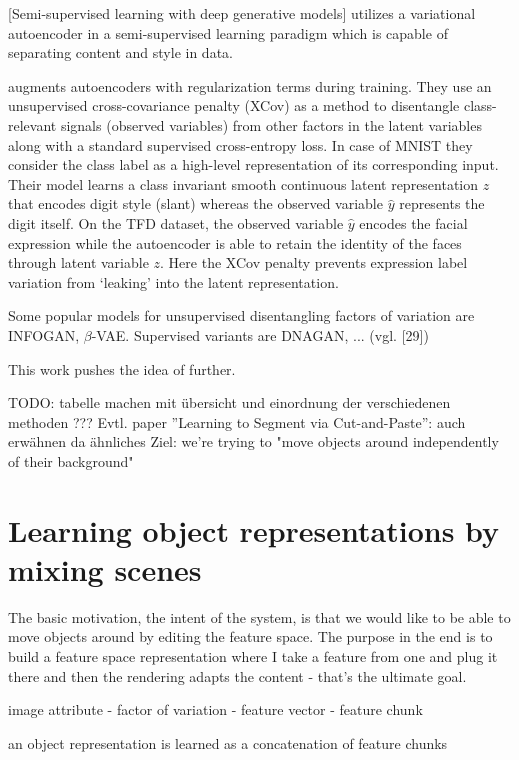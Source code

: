 \documentclass[11pt,a4paper]{article}
\begin{document}
[Semi-supervised learning with deep generative models] utilizes a variational autoencoder in a semi-supervised learning paradigm which is capable of separating content and style in data.

\par\cite{1412.6583} augments autoencoders with regularization terms during training. They use an unsupervised cross-covariance penalty (XCov) as a method to disentangle class-relevant signals (observed variables) from other factors in the latent variables along with a standard supervised cross-entropy loss. In case of MNIST they consider the class label as a high-level representation of its corresponding input. Their model learns a class invariant smooth continuous latent representation $z$ that encodes digit style (slant) whereas the observed variable $\hat{y}$ represents the digit itself. On the TFD dataset, the observed variable $\hat{y}$ encodes the facial expression while the autoencoder is able to retain the identity of the faces through latent variable $z$. Here the XCov penalty prevents expression label variation from ‘leaking’ into the latent representation.

\par Some popular models for unsupervised disentangling factors of variation are INFOGAN, $\beta$-VAE. Supervised variants are DNAGAN, ... (vgl. [29]) 

\par This work pushes the idea of \cite{1711.07410} further.

TODO: tabelle machen mit übersicht und einordnung der verschiedenen methoden ???
Evtl. paper ”Learning to Segment via Cut-and-Paste”: auch erwähnen da ähnliches Ziel: we're trying to "move objects around independently of their background"

\section{Learning object representations by mixing scenes}
The basic motivation, the intent of the system, is that we would like to be able to move objects around by editing the feature space. The purpose in the end is to build a feature space representation where I take a feature from one and plug it there and then the rendering adapts the content - that's the ultimate goal.
\par image attribute - factor of variation - feature vector - feature chunk
\par an object representation is learned as a concatenation of feature chunks
\end{document}
